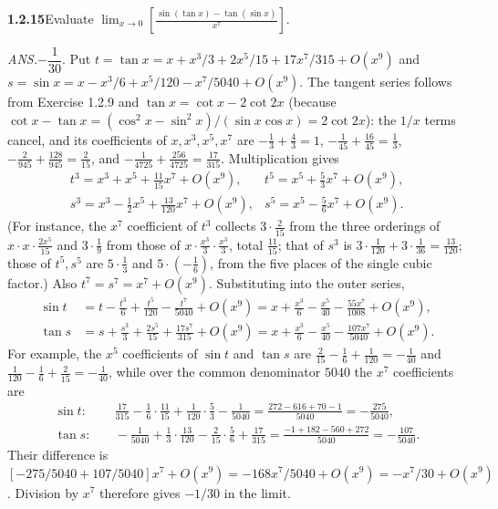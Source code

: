 \par\bigskip
\noindent\textbf{1.2.15}\quad Evaluate
$\displaystyle\lim_{x\to0}\left[\frac{\sin(\tan x)-\tan(\sin x)}{x^{7}}\right]$.
\par\nobreak\hfill\emph{ANS.}\enspace $-\dfrac{1}{30}$.
\solution
Put $t=\tan x=x+x^3/3+2x^5/15+17x^7/315+O(x^9)$ and
$s=\sin x=x-x^3/6+x^5/120-x^7/5040+O(x^9)$. The tangent series follows
from Exercise 1.2.9 and $\tan x=\cot x-2\cot2x$ (because
$\cot x-\tan x=(\cos^2x-\sin^2x)/(\sin x\cos x)=2\cot2x$): the $1/x$
terms cancel, and its coefficients of $x,x^3,x^5,x^7$ are
$-\frac13+\frac43=1$, $-\frac1{45}+\frac{16}{45}=\frac13$,
$-\frac2{945}+\frac{128}{945}=\frac2{15}$, and
$-\frac1{4725}+\frac{256}{4725}=\frac{17}{315}$. Multiplication gives
\[
\begin{array}{ll}
 t^3=x^3+x^5+\frac{11}{15}x^7+O(x^9),&
 t^5=x^5+\frac53x^7+O(x^9),\\
 s^3=x^3-\frac12x^5+\frac{13}{120}x^7+O(x^9),&
 s^5=x^5-\frac56x^7+O(x^9).
\end{array}
\]
(For instance, the $x^7$ coefficient of $t^3$ collects
$3\cdot\frac2{15}$ from the three orderings of $x\cdot x\cdot\frac{2x^5}{15}$
and $3\cdot\frac19$ from those of $x\cdot\frac{x^3}3\cdot\frac{x^3}3$,
total $\frac{11}{15}$; that of $s^3$ is
$3\cdot\frac1{120}+3\cdot\frac1{36}=\frac{13}{120}$; those of $t^5,s^5$
are $5\cdot\frac13$ and $5\cdot(-\frac16)$, from the five places of the
single cubic factor.)
Also $t^7=s^7=x^7+O(x^9)$. Substituting into the outer series,
\[
 \begin{aligned}
 \sin t&=t-\frac{t^3}6+\frac{t^5}{120}-\frac{t^7}{5040}+O(x^9)
       =x+\frac{x^3}6-\frac{x^5}{40}-\frac{55x^7}{1008}+O(x^9),\\
 \tan s&=s+\frac{s^3}3+\frac{2s^5}{15}+\frac{17s^7}{315}+O(x^9)
       =x+\frac{x^3}6-\frac{x^5}{40}-\frac{107x^7}{5040}+O(x^9).
 \end{aligned}
\]
For example, the $x^5$ coefficients of $\sin t$ and $\tan s$ are
$\frac2{15}-\frac16+\frac1{120}=-\frac1{40}$ and
$\frac1{120}-\frac16+\frac2{15}=-\frac1{40}$, while over the common
denominator $5040$ the $x^7$ coefficients are
\[
 \begin{aligned}
 \sin t:&\quad \frac{17}{315}-\frac16\cdot\frac{11}{15}
 +\frac1{120}\cdot\frac53-\frac1{5040}
 =\frac{272-616+70-1}{5040}=-\frac{275}{5040},\\
 \tan s:&\quad -\frac1{5040}+\frac13\cdot\frac{13}{120}
 -\frac2{15}\cdot\frac56+\frac{17}{315}
 =\frac{-1+182-560+272}{5040}=-\frac{107}{5040}.
 \end{aligned}
\]
Their difference is $[-275/5040+107/5040]x^7+O(x^9)
=-168x^7/5040+O(x^9)=-x^7/30+O(x^9)$. Division by $x^7$ therefore gives
$\boxed{-1/30}$ in the limit.


